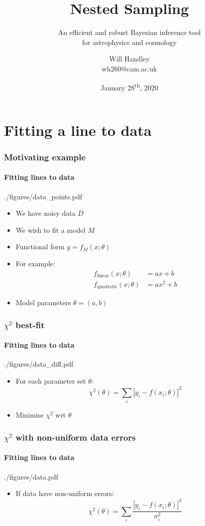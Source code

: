 \documentclass[%
]{beamer}
\title{Nested Sampling}
\subtitle{An efficient and robust Bayesian inference tool\\ for astrophysics and cosmology}
\author[Handley] %
{Will Handley\\ \small{wh260@cam.ac.uk}}
\institute[University of Cambridge] %
{%
Kavli Institute for Cosmology \\
Astrophysics Group \\
Cavendish Laboratory \\
University of Cambridge
}
\date{January 28\textsuperscript{th}, 2020}
\begin{document}
\begin{frame}
  \titlepage
\end{frame}

\section{Fitting a line to data}
\begin{frame}
    \frametitle{Motivating example}
    \framesubtitle{Fitting lines to data}
    \begin{figright}[0.4]{./figures/data_points.pdf}
        \begin{itemize}
            \item We have noisy data $D$
            \item We wish to fit a model $M$
            \item Functional form $y=f_M(x;\theta)$
            \item For example:
                \begin{align}
                     f_\text{linear}(x;\theta)&=a x + b       \nonumber\\
                     f_\text{quadratic}(x;\theta)&=a x^2 + b  \nonumber
                \end{align}
            \item Model parameters $\theta= (a,b)$
        \end{itemize}
    \end{figright}
\end{frame}

\begin{frame}
    \frametitle{$\chi^2$ best-fit}
    \framesubtitle{Fitting lines to data}
    \begin{figright}[0.4]{./figures/data_diff.pdf}
        \begin{itemize}
            \item For each parameter set $\theta$:
                \[
                    \chi^2(\theta) = \sum_i \left|y_i - f(x_i;\theta)\right|^2
                \]
            \item Minimise $\chi^2$ wrt $\theta$
        \end{itemize}
    \end{figright}
\end{frame}

\begin{frame}
    \frametitle{$\chi^2$ with non-uniform data errors}
    \framesubtitle{Fitting lines to data}
    \begin{figright}[0.4]{./figures/data.pdf}
        \begin{itemize}
            \item If data have non-uniform errors:
                \[
                    \chi^2(\theta) = \sum_i \frac{\left|y_i - f(x_i;\theta)\right|^2}{\sigma_i^2}
                \]
        \end{itemize}
    \end{figright}
\end{frame}
\end{document}
